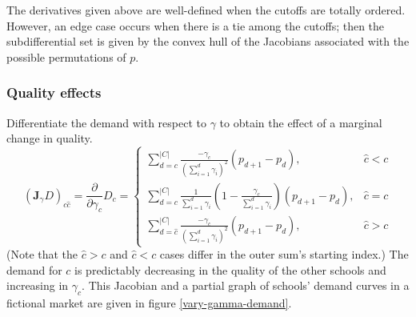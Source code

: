 \documentclass[12pt]{article}
\numberwithin{equation}{subsection}
\theoremstyle{definition}
\begin{document}
The derivatives given above are well-defined when the cutoffs are totally ordered. However, an edge case occurs when there is a tie among the cutoffs; then the subdifferential set is given by the convex hull of the Jacobians associated with the possible permutations of $p$. %

\subsubsection{Quality effects} \label{unconstrainedqualityeffects}
Differentiate the demand with respect to $\gamma$ to obtain the effect of a marginal change in quality.
\begin{equation} \label{jac-gamma-demand-uncons}
\left(\mathbf{J}_\gamma D \right)_{c\hat c} =
\frac{\partial}{\partial\gamma_{\hat c}} D_c = \begin{cases}
\sum_{d=c}^{|C|} \frac{-\gamma_c}{\left(\sum_{i=1}^{d} \gamma_i \right)^2} \left(p_{d+1} - p_d \right), & \hat c < c \\
\sum_{d=c}^{|C|} \frac{1}{\sum_{i=1}^{d} \gamma_i}
    \left( 1 - \frac{\gamma_c}{\sum_{i=1}^{d}\gamma_i }\right)
    \left(p_{d+1} - p_d \right), & \hat c = c\\
\sum_{d=\hat c}^{|C|} \frac{-\gamma_c}{\left(\sum_{i=1}^{d}\gamma_i \right)^2} \left(p_{d+1} - p_d \right), & \hat c > c
\end{cases}
\end{equation}
(Note that the $\hat c > c$ and $ \hat c < c$ cases differ in the outer sum's starting index.) The demand for $c$ is predictably decreasing in the quality of the other schools and increasing in $\gamma_c$. This Jacobian and a partial graph of schools’ demand curves in a fictional market are given in figure \ref{vary-gamma-demand}. 
\end{document}
